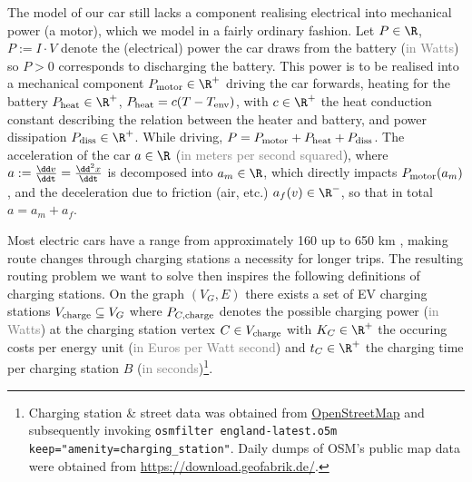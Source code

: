 \documentclass{prettytex/ox/mmsc-special-topic}
\begin{document}
  The model of our car still lacks a component realising electrical into mechanical power (a motor), which we model in a fairly ordinary fashion.
  Let $P \in \R$, $P := I \cdot V$ denote the (electrical) power the car draws from the battery (\textcolor{gray}{in Watts}) so $P > 0$ corresponds to discharging the battery.
  This power is to be realised into a mechanical component $P_{\rm motor} \in \R^+$ driving the car forwards, heating for the battery $P_{\rm heat} \in \R^+$, $P_{\rm heat} = c (T - T_{\rm env})$, with $c \in \R^+$ the heat conduction constant describing the relation between the heater and battery, and power dissipation $P_{\rm diss} \in \R^+$.
  While driving, $P = P_{\rm motor} + P_{\rm heat} + P_{\rm diss}$.
  The acceleration of the car $a \in \R$ (\textcolor{gray}{in meters per second squared}), where $a := \frac{\dd v}{\ddt} = \frac{\dd^2 x}{\ddt}$ is decomposed into $a_m \in \R$, which directly impacts $P_{\rm motor}(a_m)$, and the deceleration due to friction (air, etc.) $a_f(v) \in \R^-$, so that in total $a = a_m + a_f$.

  Most electric cars have a range from approximately 160 up to 650 km \parencite{range}, making route changes through charging stations a necessity for longer trips.
  The resulting routing problem we want to solve then inspires the following definitions of charging stations.
  On the graph $(V_G, E)$ there exists a set of EV charging stations $V_{\rm charge} \subseteq V_G$ where $P_{C,\rm charge}$ denotes the possible charging power (\textcolor{gray}{in Watts}) at the charging station vertex $C \in V_{\rm charge}$ with $K_C \in \R^+$ the occuring costs per energy unit (\textcolor{gray}{in Euros per Watt second}) and $t_C \in \R^+$ the charging time per charging station $B$ (\textcolor{gray}{in seconds})\footnote{
    Charging station \& street data was obtained from \href{https://osm.org/}{OpenStreetMap} and subsequently invoking
    \texttt{osmfilter england-latest.o5m \-\-keep="amenity=charging\_station"}.
    Daily dumps of OSM's public map data were obtained from \url{https://download.geofabrik.de/}.
  }.
\end{document}
